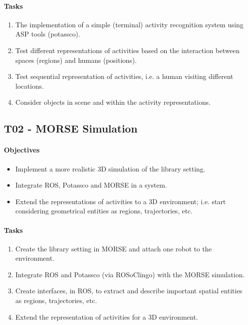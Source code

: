 \paragraph{Tasks}
\begin{enumerate}[label= T01-\Alph*:]
\item The implementation of a simple (terminal) activity recognition system using ASP tools (potassco).
\item Test different representations of activities based on the interaction between spaces (regions) and humans (positions).
\item Test sequential representation of activities, i.e. a human visiting different locations.
\item Consider objects in scene and within the activity representations.
\end{enumerate}


\subsection*{T02 - MORSE Simulation}
\paragraph{Objectives}
\begin{itemize}
\item Implement a more realistic 3D simulation of the library setting.
\item Integrate ROS, Potassco and MORSE in a system.
\item Extend the representations of activities to a 3D environment; i.e. start considering geometrical entities as regions, trajectories, etc.
\end{itemize}
\paragraph{Tasks}
\begin{enumerate}[label= T02-\Alph*:]
\item Create the library setting in MORSE and attach one robot to the environment.
\item Integrate ROS and Potassco (via ROSoClingo) with the MORSE simulation.
\item Create interfaces, in ROS, to extract and describe important spatial entities as regions, trajectories, etc.
\item Extend the representation of activities for a 3D environment.
\end{enumerate}


